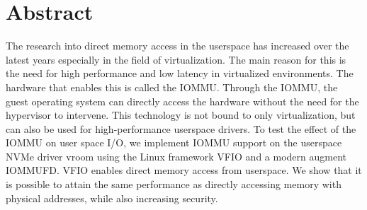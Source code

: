 \chapter{Abstract}

The research into direct memory access in the userspace has increased over the latest years especially in the field of virtualization. The main reason for this is the need for high performance and low latency in virtualized environments.
The hardware that enables this is called the IOMMU. Through the IOMMU, the guest operating system can directly access the hardware without the need for the hypervisor to intervene.
This technology is not bound to only virtualization, but can also be used for high-performance userspace drivers.
To test the effect of the IOMMU on user space I/O, we implement IOMMU support on the userspace NVMe driver vroom using the Linux framework VFIO and a modern augment IOMMUFD. VFIO enables direct memory access from userspace.
We show that it is possible to attain the same performance as directly accessing memory with physical addresses, while also increasing security.
